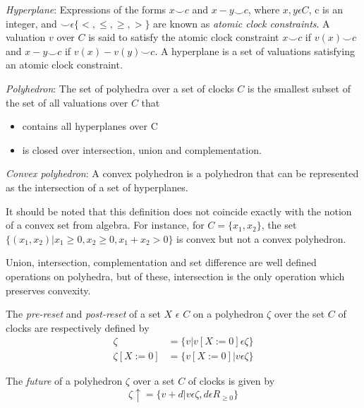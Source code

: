 \documentclass[a4paper]{llncs}
\begin{document}
\begin{definition}
\emph{Hyperplane}: Expressions of the forms $x \smile c$ and $x - y
\smile c$, where $x, y \epsilon C$, c is an integer, and $\smile
\epsilon \{ <, \leq, \geq, >\}$ are known as \emph{atomic clock
  constraints}. A valuation $v$ over $C$ is said to satisfy the
atomic clock constraint $x \smile c$ if $v(x) \smile c$ and $x - y
\smile c$ if $v(x) - v(y) \smile c$. A hyperplane is a set of
valuations satisfying an atomic clock constraint.
\end{definition}

\begin{definition}
\emph{Polyhedron}: The set of polyhedra over a set of clocks $C$ is
the smallest subset of the set of all valuations over $C$ that 
\begin{itemize}
\item contains all hyperplanes over C
\item is closed over intersection, union and complementation.
\end{itemize}
\end{definition}

\begin{definition}
\emph{Convex polyhedron}: A convex polyhedron is a polyhedron that can
be represented as the intersection of a set of hyperplanes.
\end{definition}

It should be noted that this definition does not coincide exactly with
the notion of a convex set from algebra. For instance, for
$C=\{x_1, x_2\}$, the set $\{(x_1, x_2)| x_1 \geq 0, x_2 \geq 0, x_1 +
x_2 > 0\}$ is convex but not a convex polyhedron.

Union, intersection, complementation and set difference are well
defined operations on polyhedra, but of these, intersection is the
only operation which preserves convexity.

The \emph{pre-reset} and \emph{post-reset} of a set $X$ $\epsilon$ $C$ on a
polyhedron $\zeta$ over the set $C$ of clocks are respectively defined
by
\begin{align*}
[X := 0]\zeta &= \{v| v[X := 0] \epsilon \zeta \} \\
\zeta[X := 0] &= \{v[X := 0]| v \epsilon \zeta \}
\end{align*}

The \emph{future} of a polyhedron $\zeta$ over a set $C$ of clocks
is given by 
\begin{displaymath}
\zeta \uparrow = \{v + d| v \epsilon \zeta, d \epsilon R_{\geq 0}\}
\end{displaymath}
\end{document}
